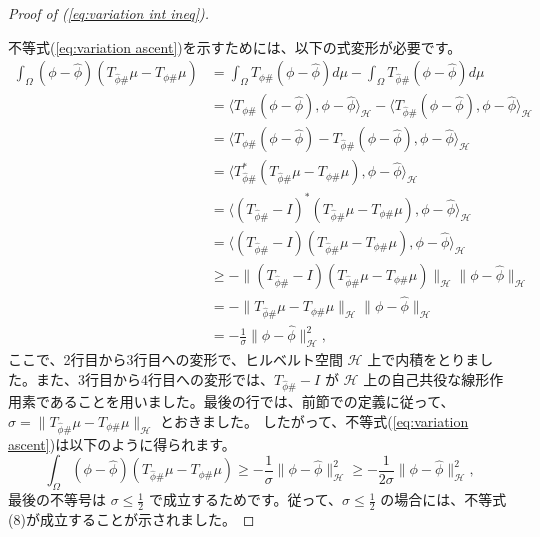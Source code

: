 \documentclass{jsarticle}
\theoremstyle{definition}
\begin{document}
\begin{proof}[Proof of (\ref{eq:variation int ineq})]
  \hypertarget{proof:eq:variation int ineq}{}
  不等式(\ref{eq:variation ascent})を示すためには、以下の式変形が必要です。
  \begin{align*}
    \int_\Omega (\phi - \hat{\phi})(T_{\hat{\phi} \#} \mu - T_{\phi \#} \mu)  &= \int_\Omega T_{\phi \#}(\phi - \hat{\phi}) d\mu - \int_\Omega T_{\hat{\phi} \#}(\phi - \hat{\phi}) d\mu \\
                                                                              &= \langle T_{\phi \#}(\phi - \hat{\phi}), \phi - \hat{\phi} \rangle_{\mathcal{H}} - \langle T_{\hat{\phi} \#}(\phi - \hat{\phi}), \phi - \hat{\phi} \rangle_{\mathcal{H}} \\
                                                                              &= \langle T_{\phi \#}(\phi - \hat{\phi}) - T_{\hat{\phi} \#}(\phi - \hat{\phi}), \phi - \hat{\phi} \rangle_{\mathcal{H}} \\
                                                                              &= \langle T_{\hat{\phi} \#}^*(T_{\hat{\phi} \#} \mu - T_{\phi \#} \mu), \phi - \hat{\phi} \rangle_{\mathcal{H}} \\
                                                                              &= \langle (T_{\hat{\phi} \#} - I)^*(T_{\hat{\phi} \#} \mu - T_{\phi \#} \mu), \phi - \hat{\phi} \rangle_{\mathcal{H}} \\
                                                                              &= \langle (T_{\hat{\phi} \#} - I)(T_{\hat{\phi} \#} \mu - T_{\phi \#} \mu), \phi - \hat{\phi} \rangle_{\mathcal{H}} \\
                                                                              &\geq - \|(T_{\hat{\phi} \#} - I)(T_{\hat{\phi} \#} \mu - T_{\phi \#} \mu)\|_{\mathcal{H}} \|\phi - \hat{\phi}\|_{\mathcal{H}} \\
                                                                              &= - \|T_{\hat{\phi} \#} \mu - T_{\phi \#} \mu\|_{\mathcal{H}} \|\phi - \hat{\phi}\|_{\mathcal{H}} \\
                                                                              &= - \frac{1}{\sigma} \|\phi - \hat{\phi}\|_{\mathcal{H}}^2,
  \end{align*}
  ここで、2行目から3行目への変形で、ヒルベルト空間 $\mathcal{H}$ 上で内積をとりました。また、3行目から4行目への変形では、$T_{\hat{\phi} \#} - I$ が $\mathcal{H}$ 上の自己共役な線形作用素であることを用いました。最後の行では、前節での定義に従って、$\sigma = \|T_{\hat{\phi} \#} \mu - T_{\phi \#} \mu\|_{\mathcal{H}}$ とおきました。
  したがって、不等式(\ref{eq:variation ascent})は以下のように得られます。
  $$
  \int_\Omega (\phi - \hat{\phi})(T_{\hat{\phi} \#} \mu - T_{\phi \#} \mu) \geq - \frac{1}{\sigma} \|\phi - \hat{\phi}\|_{\mathcal{H}}^2 \geq - \frac{1}{2\sigma} \|\phi - \hat{\phi}\|_{\mathcal{H}}^2,
  $$
  最後の不等号は $\sigma \leq \frac{1}{2}$ で成立するためです。従って、$\sigma \leq \frac{1}{2}$ の場合には、不等式(8)が成立することが示されました。
\end{proof}
\end{document}
